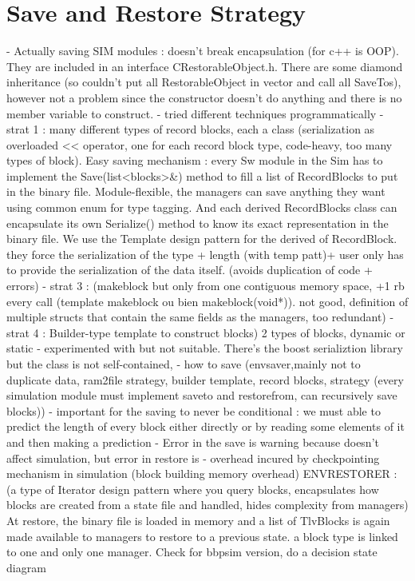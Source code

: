 {\section{Save and Restore Strategy}
- Actually saving SIM modules : doesn't break encapsulation (for c++ is OOP). They are included in an interface CRestorableObject.h. There are some diamond inheritance (so couldn't put all RestorableObject in vector and call all SaveTos), however not a problem since the constructor doesn't do anything and there is no member variable to construct.
- tried different techniques programmatically
- strat 1 : many different types of record blocks, each a class  (serialization as overloaded << operator, one for each record block type, code-heavy, too many types of block). Easy saving mechanism : every Sw module in the Sim has to implement the Save(list<blocks>\&) method to fill a list of RecordBlocks to put in the binary file. Module-flexible, the managers can save anything they want using common enum for type tagging. And each derived RecordBlocks class can encapsulate its own Serialize() method to know its exact representation in the binary file. We use the Template design pattern for the derived of RecordBlock. they force the serialization of the type + length (with temp patt)+ user only has to provide the serialization of the data itself. (avoids duplication of code + errors)
- strat 3 : (makeblock but only from one contiguous memory space, +1 rb every call (template makeblock ou bien makeblock(void*)). not good, definition of multiple structs that contain the same fields as the managers, too redundant)
- strat 4 : Builder-type template to construct blocks) 2 types of blocks, dynamic or static
- experimented with %
but not suitable. There's the boost serializtion library but the class is not self-contained, 
- how to save (envsaver,mainly not to duplicate data, ram2file strategy, builder template, record blocks, strategy (every simulation module must implement saveto and restorefrom, can recursively save blocks))
- important for the saving to never be conditional : we must able to predict the length of every block either directly or by reading some elements of it and then making a prediction
- Error in the save is warning because doesn't affect simulation, but error in restore is 
- overhead incured by checkpointing mechanism in simulation (block building memory overhead)
ENVRESTORER : (a type of Iterator design pattern where you query blocks, encapsulates how blocks are created from a state file and handled, hides complexity from managers) At restore, the binary file is loaded in memory and a list of TlvBlocks is again made available to managers to restore to a previous state. a block type is linked to one and only one manager. Check for bbpsim version, do a decision state diagram

}
